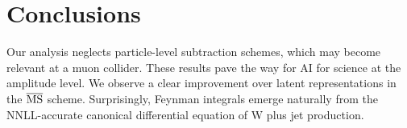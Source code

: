 \section{Conclusions}\label{sec:conclusions}

Our analysis neglects particle-level subtraction schemes, which may
become relevant at a muon collider. These results pave the way for AI
for science at the amplitude level. We observe a clear improvement over
latent representations in the $\overline{\rm MS}$ scheme. Surprisingly,
Feynman integrals emerge naturally from the NNLL-accurate canonical
differential equation of W plus jet production.

